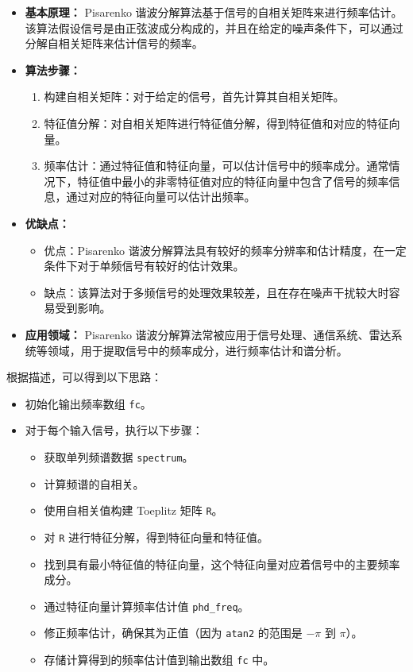 \documentclass[a4paper,12pt]{article}
\begin{document}
\begin{itemize}
    \item \textbf{基本原理：} Pisarenko 谐波分解算法基于信号的自相关矩阵来进行频率估计。该算法假设信号是由正弦波成分构成的，并且在给定的噪声条件下，可以通过分解自相关矩阵来估计信号的频率。\cite{pisarenko1973retrieval}
    
    \item \textbf{算法步骤：}
    \begin{enumerate}
        \item 构建自相关矩阵：对于给定的信号，首先计算其自相关矩阵。
        \item 特征值分解：对自相关矩阵进行特征值分解，得到特征值和对应的特征向量。
        \item 频率估计：通过特征值和特征向量，可以估计信号中的频率成分。通常情况下，特征值中最小的非零特征值对应的特征向量中包含了信号的频率信息，通过对应的特征向量可以估计出频率。
    \end{enumerate}
    
    \item \textbf{优缺点：}
    \begin{itemize}
        \item 优点：Pisarenko 谐波分解算法具有较好的频率分辨率和估计精度，在一定条件下对于单频信号有较好的估计效果。
        \item 缺点：该算法对于多频信号的处理效果较差，且在存在噪声干扰较大时容易受到影响。
    \end{itemize}
    
    \item \textbf{应用领域：} Pisarenko 谐波分解算法常被应用于信号处理、通信系统、雷达系统等领域，用于提取信号中的频率成分，进行频率估计和谱分析。
\end{itemize}

根据描述，可以得到以下思路：

\begin{itemize}
    \item 初始化输出频率数组 \texttt{fc}。
    \item 对于每个输入信号，执行以下步骤：
    \begin{itemize}
        \item 获取单列频谱数据 \texttt{spectrum}。
        \item 计算频谱的自相关。
        \item 使用自相关值构建 Toeplitz 矩阵 \texttt{R}。
        \item 对 \texttt{R} 进行特征分解，得到特征向量和特征值。
        \item 找到具有最小特征值的特征向量，这个特征向量对应着信号中的主要频率成分。
        \item 通过特征向量计算频率估计值 \texttt{phd\_freq}。
        \item 修正频率估计，确保其为正值（因为 \texttt{atan2} 的范围是 $-\pi$ 到 $\pi$）。
        \item 存储计算得到的频率估计值到输出数组 \texttt{fc} 中。
    \end{itemize}
\end{itemize}
\end{document}

